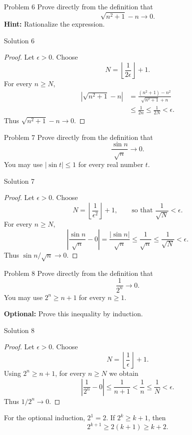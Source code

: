 \documentclass{beamer}
\begin{document}
\begin{frame}{Problem 6}
Prove directly from the definition that
\[
  \sqrt{n^2+1}-n\longrightarrow 0.
\]
\textbf{Hint:} Rationalize the expression.
\end{frame}

\begin{frame}{Solution 6}
\begin{proof}
Let $\epsilon>0$. Choose
\[
  N=\left\lfloor\frac{1}{2\epsilon}\right\rfloor+1.
\]
For every $n\geq N$,
\[
\begin{aligned}
  \left\lvert\sqrt{n^2+1}-n\right\rvert
  &=\frac{(n^2+1)-n^2}{\sqrt{n^2+1}+n}\\
  &\leq\frac{1}{2n}\leq\frac{1}{2N}<\epsilon.
\end{aligned}
\]
Thus $\sqrt{n^2+1}-n\to0$.
\end{proof}
\end{frame}

\begin{frame}{Problem 7}
Prove directly from the definition that
\[
  \frac{\sin n}{\sqrt{n}}\longrightarrow 0.
\]
You may use $\lvert\sin t\rvert\leq1$ for every real number $t$.
\end{frame}

\begin{frame}{Solution 7}
\begin{proof}
Let $\epsilon>0$. Choose
\[
  N=\left\lfloor\frac{1}{\epsilon^2}\right\rfloor+1,
  \qquad\text{so that }\frac{1}{\sqrt{N}}<\epsilon.
\]
For every $n\geq N$,
\[
  \left\lvert\frac{\sin n}{\sqrt{n}}-0\right\rvert
  =\frac{\lvert\sin n\rvert}{\sqrt{n}}
  \leq\frac{1}{\sqrt{n}}\leq\frac{1}{\sqrt{N}}<\epsilon.
\]
Thus $\sin n/\sqrt{n}\to0$.
\end{proof}
\end{frame}

\begin{frame}{Problem 8}
Prove directly from the definition that
\[
  \frac{1}{2^n}\longrightarrow 0.
\]
You may use $2^n\geq n+1$ for every $n\geq1$.
\medskip

\textbf{Optional:} Prove this inequality by induction.
\end{frame}

\begin{frame}{Solution 8}
\begin{proof}
Let $\epsilon>0$. Choose
\[
  N=\left\lfloor\frac{1}{\epsilon}\right\rfloor+1.
\]
Using $2^n\geq n+1$, for every $n\geq N$ we obtain
\[
  \left\lvert\frac{1}{2^n}-0\right\rvert
  \leq\frac{1}{n+1}<\frac{1}{n}\leq\frac{1}{N}<\epsilon.
\]
Thus $1/2^n\to0$.
\end{proof}
\medskip

For the optional induction, $2^1=2$. If $2^k\geq k+1$, then
\[
  2^{k+1}\geq2(k+1)\geq k+2.
\]
\end{frame}
\end{document}
